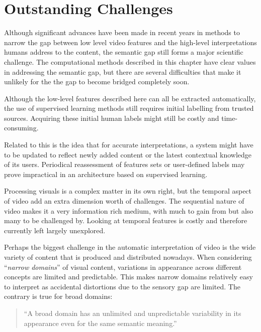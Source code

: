 \section{Outstanding Challenges} %
\label{sec:outstanding_challenges}

Although significant advances have been made in recent years in methods to narrow the gap between low level video features and the high-level interpretations humans address to the content, the semantic gap still forms a major scientific challenge. The computational methods described in this chapter have clear values in addressing the semantic gap, but there are several difficulties that make it unlikely for the the gap to become bridged completely soon.

Although the low-level features described here can all be extracted automatically, the use of supervised learning methods still requires initial labelling from trusted sources. Acquiring these initial human labels might still be costly and time-consuming.

Related to this is the idea that for accurate interpretations, a system might have to be updated to reflect newly added content or the latest contextual knowledge of its users. Periodical reassessment of features sets or user-defined labels may prove impractical in an architecture based on supervised learning.

Processing visuals is a complex matter in its own right, but the temporal aspect of video add an extra dimension worth of challenges. The sequential nature of video makes it a very information rich medium, with much to gain from but also many to be  challenged by. Looking at temporal features is costly and therefore currently left largely unexplored.

Perhaps the biggest challenge in the automatic interpretation of video is the wide variety of content that is produced and distributed nowadays. When considering ``\emph{narrow domains}'' of visual content, variations in appearance across different concepts are limited and predictable\cite{Smeulders:2000tx}. This makes narrow domains relatively easy to interpret as accidental distortions due to the sensory gap are limited. The contrary is true for broad domains:

\begin{quote}
  ``A broad domain has an unlimited and unpredictable variability in its appearance even for the same semantic meaning.''\cite{Smeulders:2000tx}
\end{quote}

